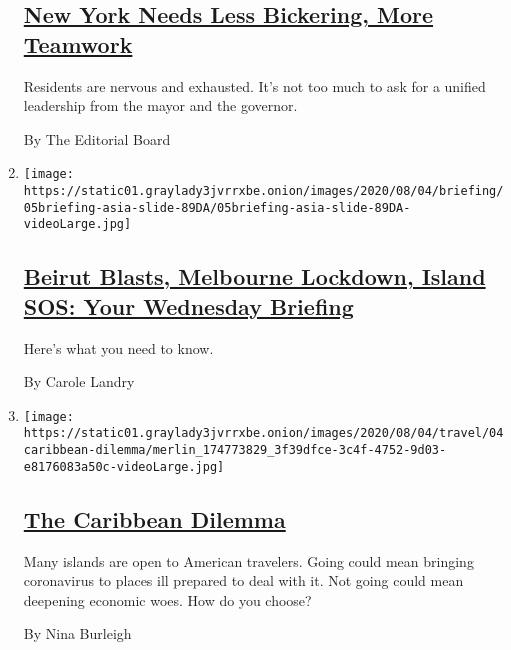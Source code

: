 \begin{enumerate}
  \hypertarget{new-york-needs-less-bickering-more-teamwork}{%
  \subsection{\texorpdfstring{\href{/2020/08/04/opinion/cuomo-de-blasio-coronavirus-nyc.html}{New
  York Needs Less Bickering, More
  Teamwork}}{New York Needs Less Bickering, More Teamwork}}\label{new-york-needs-less-bickering-more-teamwork}}

  Residents are nervous and exhausted. It's not too much to ask for a
  unified leadership from the mayor and the governor.

  By The Editorial Board
\item
  \texttt{[image: https://static01.graylady3jvrrxbe.onion/images/2020/08/04/briefing/05briefing-asia-slide-89DA/05briefing-asia-slide-89DA-videoLarge.jpg]}

  \hypertarget{beirut-blasts-melbourne-lockdown-island-sos-your-wednesday-briefing}{%
  \subsection{\texorpdfstring{\href{/2020/08/04/briefing/beirut-explosion-melbourne-lockdown-pakistan.html}{Beirut
  Blasts, Melbourne Lockdown, Island SOS: Your Wednesday
  Briefing}}{Beirut Blasts, Melbourne Lockdown, Island SOS: Your Wednesday Briefing}}\label{beirut-blasts-melbourne-lockdown-island-sos-your-wednesday-briefing}}

  Here's what you need to know.

  By Carole Landry
\item
  \texttt{[image: https://static01.graylady3jvrrxbe.onion/images/2020/08/04/travel/04caribbean-dilemma/merlin\_174773829\_3f39dfce-3c4f-4752-9d03-e8176083a50c-videoLarge.jpg]}

  \hypertarget{the-caribbean-dilemma}{%
  \subsection{\texorpdfstring{\href{/2020/08/04/travel/coronavirus-caribbean-vacations.html}{The
  Caribbean
  Dilemma}}{The Caribbean Dilemma}}\label{the-caribbean-dilemma}}

  Many islands are open to American travelers. Going could mean bringing
  coronavirus to places ill prepared to deal with it. Not going could
  mean deepening economic woes. How do you choose?

  By Nina Burleigh
\end{enumerate}

